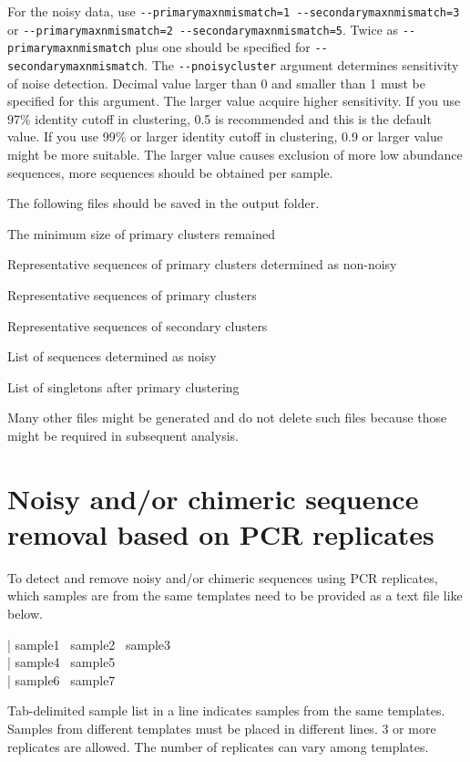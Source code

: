 \documentclass[titlepage,10pt,a4paper,english]{jsbook}
\newenvironment{content}{\begin{shaded}\vspace{-1em}\raggedright\ttfamily\footnotesize\setlength{\baselineskip}{1.4em}}{\end{shaded}\vspace{-1em}}
\begin{document}
For the noisy data, use \texttt{{-}{-}primarymaxnmismatch=1 {-}{-}secondarymaxnmismatch=3} or \texttt{{-}{-}primarymaxnmismatch=2 {-}{-}secondarymaxnmismatch=5}.
Twice as \texttt{{-}{-}primarymaxnmismatch} plus one should be specified for \texttt{{-}{-}secondarymaxnmismatch}.
The \texttt{{-}{-}pnoisycluster} argument determines sensitivity of noise detection.
Decimal value larger than 0 and smaller than 1 must be specified for this argument.
The larger value acquire higher sensitivity.
If you use 97\% identity cutoff in clustering, 0.5 is recommended and this is the default value.
If you use 99\% or larger identity cutoff in clustering, 0.9 or larger value might be more suitable.
The larger value causes exclusion of more low abundance sequences, more sequences should be obtained per sample.

The following files should be saved in the output folder.
\begin{description}\small\setlength{\baselineskip}{1.1em}
\item[parameter.txt] The minimum size of primary clusters remained
\item[primarycluster.denoised.fasta.gz] Representative sequences of primary clusters determined as non-noisy
\item[primarycluster.fasta.gz] Representative sequences of primary clusters
\item[secondarycluster.fasta.gz] Representative sequences of secondary clusters
\item[RunID{\textunderscore}{\textunderscore}TagID{\textunderscore}{\textunderscore}PrimerID.noisyreads.txt.gz] List of sequences determined as noisy
\item[RunID{\textunderscore}{\textunderscore}TagID{\textunderscore}{\textunderscore}PrimerID.singletons.txt.gz] List of singletons after primary clustering
\end{description}
Many other files might be generated and do not delete such files because those might be required in subsequent analysis.

\section{Noisy and/or chimeric sequence removal based on PCR replicates}

To detect and remove noisy and/or chimeric sequences using PCR replicates, which samples are from the same templates need to be provided as a text file like below.
\begin{content}
| sample1~ sample2~ sample3\\
| sample4~ sample5\\
| sample6~ sample7
\end{content}
Tab-delimited sample list in a line indicates samples from the same templates.
Samples from different templates must be placed in different lines.
3 or more replicates are allowed.
The number of replicates can vary among templates.
\end{document}
